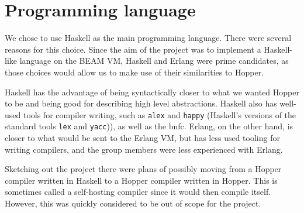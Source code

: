 \section{Programming language}


We chose to use Haskell as the main programming language. There were several reasons for this choice. Since the aim of the project was to implement a Haskell-like language on the BEAM VM, Haskell and Erlang were prime candidates, as those choices would allow us to make use of their similarities to Hopper.

Haskell has the advantage of being syntactically closer to what we wanted Hopper to be and being good for describing high level abstractions. Haskell also has well-used tools for compiler writing, such as \texttt{alex} and \texttt{happy} (Haskell's versions of the standard tools \texttt{lex}\cite{lex} and \texttt{yacc}\cite{yacc})), as well as the \gls{bnfc}. Erlang, on the other hand, is closer to what would be sent to the Erlang VM, but has less used tooling for writing compilers, and the group members were less experienced with Erlang.

Sketching out the project there were plans of possibly moving from a Hopper compiler written in Haskell to a Hopper compiler written in Hopper. This is sometimes called a self-hosting compiler since it would then compile itself. However, this was quickly considered to be out of scope for the project.
